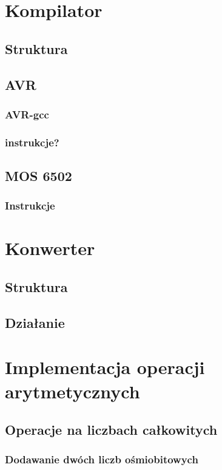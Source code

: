 \documentclass[11pt]{aghdpl}
\begin{document}
\chapter{Kompilator}
\section{Struktura}
\section{AVR}
\subsection{AVR-gcc}
\subsection{instrukcje?}
\section{MOS 6502}
\subsection{Instrukcje}

\chapter{Konwerter}
\section{Struktura}
\section{Działanie}

\chapter{Implementacja operacji arytmetycznych}
\section{Operacje na liczbach całkowitych}
\subsection{Dodawanie dwóch liczb ośmiobitowych}

\end{document}
